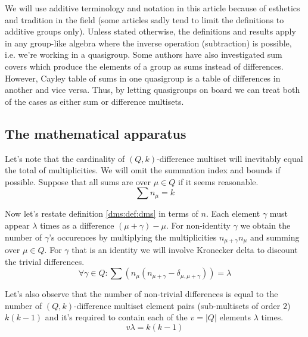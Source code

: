\begin{remark}
    \label{dms:remark:abelian}
    We will use additive terminology and notation in this article because of esthetics and tradition in the field (some articles sadly tend to limit the definitions to additive groups only). Unless stated otherwise, the definitions and results apply in any group-like algebra where the inverse operation (subtraction) is possible, i.e. we're working in a quasigroup.
    Some authors \cite{haanpaa2004minimum} have also investigated sum covers which produce the elements of a group as sums instead of differences. However, Cayley table of sums in one quasigroup is a table of differences in another and vice versa. Thus, by letting quasigroups on board we can treat both of the cases as either sum or difference multisets.
\end{remark}

\subsection{The mathematical apparatus}
    Let's note that the cardinality of $(Q,k)$-difference multiset will inevitably equal the total of multiplicities. We will omit the summation index and bounds if possible. Suppose that all sums are over $\mu \in Q$ if it seems reasonable.
    \begin{equation}
        \label{apparatus:eq:ni}
        \sum {n_\mu} = k
    \end{equation}
    
    Now let's restate definition \ref{dms:def:dms} in terms of $n$. Each element $\gamma$ must appear $\lambda$ times as a difference $(\mu+\gamma)-\mu$. For non-identity $\gamma$ we obtain the number of $\gamma$'s occurences by multiplying the multiplicities $n_{\mu+\gamma} n_\mu$ and summing over $\mu \in Q$. For $\gamma$ that is an identity we will involve Kronecker delta to discount the trivial differences.
    \begin{equation}
        \label{apparatus:eq:system}
        \forall \gamma \in Q \colon \sum (n_\mu(n_{\mu+\gamma}-\delta_{\mu,\mu+\gamma})) = \lambda
    \end{equation}
    
    Let's also observe that the number of non-trivial differences is equal to the number of $(Q,k)$-difference multiset element pairs (sub-multisets of order $2$) $k(k-1)$ and it's required to contain each of the $v=|Q|$ elements $\lambda$ times.
    \begin{equation}
        \label{apparatus:eq:parameters}
        v\lambda = k(k-1)
    \end{equation}
    
